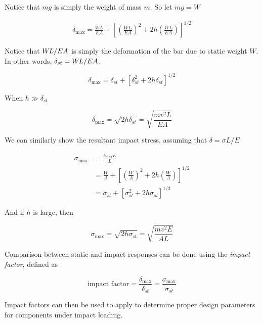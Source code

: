 \documentclass[
fontsize=10pt,
a4paper,
twosides=false,
open=any,
svgnames,
]{kaobook} %
\begin{document}
Notice that $mg$ is simply the weight of mass $m$. So let $mg = W$

\begin{align*}
  \delta_{\max} = \frac{WL}{EA} + \left[ \left( \frac{WL}{EA} \right)^2 + 2h \left( \frac{WL}{EA} \right) \right]^{1/2}
\end{align*}

Notice that $W\mspace{-2mu}L/EA$ is simply the deformation of the bar due to static weight $W$. In other words, $\delta_{st} = W\mspace{-2mu}L/EA$.

\begin{equation}
  \delta_{\max} = \delta_{st} + \left[ \delta_{st}^2 + 2h\delta_{st} \right]^{1/2}
\end{equation}

When $h \gg \delta_{st}$

\begin{equation}
  \delta_{\max} = \sqrt{2h \delta_{st}} = \sqrt{ \frac{mv^2L}{EA} }
\end{equation}

We can similarly show the resultant impact stress, assuming that $\delta = \sigma L / E$

\begin{align}
  \sigma_{\max} &= \frac{\delta_{\max} E}{L} \nonumber \\
                &= \frac{W}{A} + \left[ \left( \frac{W}{A} \right)^2 + 2h \left( \frac{W}{A} \right) \right]^{1/2} \nonumber \\
                &= \sigma_{st} + \left[ \sigma_{st}^2 + 2h \sigma_{st} \right]^{1/2}
\end{align}

And if $h$ is large, then

\begin{equation}
  \sigma_{\max} = \sqrt{ 2h \sigma_{st} } = \sqrt{ \frac{mv^2 E}{AL} }
\end{equation}

Comparison between static and impact responses can be done using the \emph{impact factor}, defined as

\begin{equation}
  \text{impact factor} = \frac{\delta_{\max}}{\delta_{st}} = \frac{\sigma_{\max}}{\sigma_{st}}
\end{equation}

Impact factors can then be used to apply to determine proper design parameters for components under impact loading.

  
\end{document}
